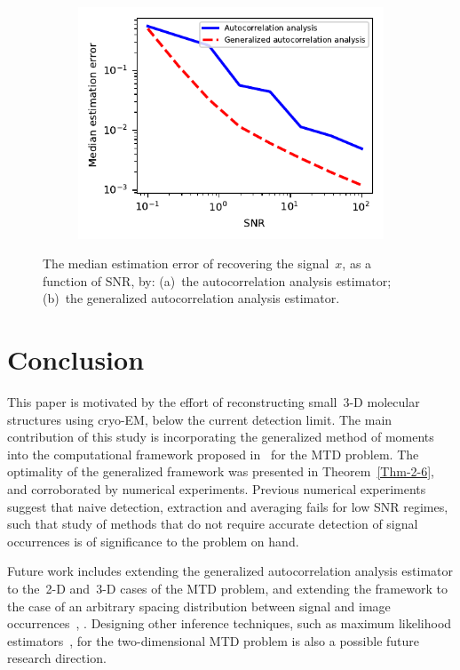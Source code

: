 \documentclass{article}
\begin{document}
\begin{figure}[!tb]
	\begin{subfigure}[ht]{\columnwidth}
		\centering
		\includegraphics[width=\columnwidth]{figures/experiment_SNR_err.pdf}
	\end{subfigure}
	\caption{The median estimation error of recovering the signal~$x$, as a function of SNR, by: (a)~the autocorrelation analysis estimator; (b)~the generalized autocorrelation analysis estimator.}
\label{fig:err_noise_experiment}
\end{figure}

\section{Conclusion}
\label{sec:conclusion}
This paper is motivated by the effort of reconstructing small~\mbox{3-D} molecular structures using \mbox{cryo-EM}, below the current detection limit. The main contribution of this study is incorporating the generalized method of moments into the computational framework proposed in~\cite{bendory2018toward} for the MTD problem. The optimality of the generalized framework was presented in Theorem~\ref{Thm-2-6}, and corroborated by numerical experiments. Previous numerical experiments~\cite{kreymer2021two} suggest that naive detection, extraction and averaging fails for low SNR regimes, such that study of methods that do not require accurate detection of signal occurrences is of significance to the problem on hand.

Future work includes extending the generalized autocorrelation analysis estimator to the~\mbox{2-D} and~\mbox{3-D} cases of the MTD problem, and extending the framework to the case of an arbitrary spacing distribution between signal and image occurrences~\cite{lan2020multi}, \cite{kreymer2021two}. Designing other inference techniques, such as maximum likelihood estimators~\cite{lan2020multi}, for the two-dimensional MTD problem is also a possible future research direction.


\vfill



\end{document}

